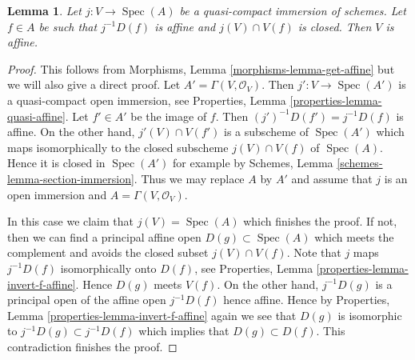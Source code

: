 \documentclass[10pt,a4paper]{amsart}
\theoremstyle{plain}
\newtheorem{lemma}[subsection]{Lemma}
\theoremstyle{definition}
\theoremstyle{remark}
\numberwithin{equation}{subsection}
\def\Spec{\mathop{\mathrm{Spec}}}
\begin{document}
\begin{lemma}
\label{lemma-get-affine}
Let $j : V \to \Spec(A)$ be a quasi-compact immersion of schemes.
Let $f \in A$ be such that $j^{-1}D(f)$ is affine and $j(V) \cap V(f)$
is closed. Then $V$ is affine.
\end{lemma}

\begin{proof}
This follows from Morphisms, Lemma \ref{morphisms-lemma-get-affine}
but we will also give a direct proof.
Let $A' = \Gamma(V, \mathcal{O}_V)$. Then $j' : V \to \Spec(A')$ is a
quasi-compact open immersion, see
Properties, Lemma \ref{properties-lemma-quasi-affine}.
Let $f' \in A'$ be the image of $f$. Then $(j')^{-1}D(f') = j^{-1}D(f)$
is affine. On the other hand, $j'(V) \cap V(f')$ is a subscheme of
$\Spec(A')$ which maps isomorphically to the closed subscheme
$j(V) \cap V(f)$ of $\Spec(A)$. Hence it is closed in $\Spec(A')$
for example by Schemes, Lemma \ref{schemes-lemma-section-immersion}.
Thus we may replace $A$ by $A'$ and assume that $j$ is an open immersion
and $A = \Gamma(V, \mathcal{O}_V)$.

\medskip\noindent
In this case we claim that $j(V) = \Spec(A)$ which finishes the proof.
If not, then we can find a principal affine open $D(g) \subset \Spec(A)$
which meets the complement and avoids the closed subset $j(V) \cap V(f)$.
Note that $j$ maps $j^{-1}D(f)$ isomorphically onto $D(f)$, see
Properties, Lemma \ref{properties-lemma-invert-f-affine}.
Hence $D(g)$ meets $V(f)$. On the other hand, $j^{-1}D(g)$
is a principal open of the affine open $j^{-1}D(f)$ hence affine.
Hence by
Properties, Lemma \ref{properties-lemma-invert-f-affine}
again we see that $D(g)$ is isomorphic to $j^{-1}D(g) \subset j^{-1}D(f)$
which implies that $D(g) \subset D(f)$. This contradiction finishes
the proof.
\end{proof}
\end{document}
